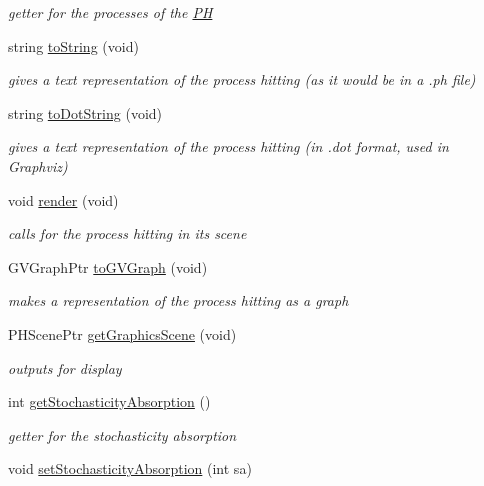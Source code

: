 \begin{DoxyCompactItemize}
\begin{DoxyCompactList}\small\item\em getter for the processes of the \hyperlink{class_p_h}{\-P\-H} \end{DoxyCompactList}\item 
string \hyperlink{class_p_h_ae870206aad796943dffaa6bab1f7f293}{to\-String} (void)
\begin{DoxyCompactList}\small\item\em gives a text representation of the process hitting (as it would be in a .ph file) \end{DoxyCompactList}\item 
string \hyperlink{class_p_h_aa0a7716cb565380f06670517609ee960}{to\-Dot\-String} (void)
\begin{DoxyCompactList}\small\item\em gives a text representation of the process hitting (in .dot format, used in \-Graphviz) \end{DoxyCompactList}\item 
void \hyperlink{class_p_h_af1f67304076aded44a15a30aed6dc652}{render} (void)
\begin{DoxyCompactList}\small\item\em calls for the process hitting in its scene \end{DoxyCompactList}\item 
\-G\-V\-Graph\-Ptr \hyperlink{class_p_h_a220fd9fdc673988edb461b02a90edb1b}{to\-G\-V\-Graph} (void)
\begin{DoxyCompactList}\small\item\em makes a representation of the process hitting as a graph \end{DoxyCompactList}\item 
\-P\-H\-Scene\-Ptr \hyperlink{class_p_h_aaf75a785bb9bd06cec611f0fb69d05f6}{get\-Graphics\-Scene} (void)
\begin{DoxyCompactList}\small\item\em outputs for display \end{DoxyCompactList}\item 
\hypertarget{class_p_h_a0494ca8a53e983230a9df06fa71043e1}{int \hyperlink{class_p_h_a0494ca8a53e983230a9df06fa71043e1}{get\-Stochasticity\-Absorption} ()}\label{class_p_h_a0494ca8a53e983230a9df06fa71043e1}

\begin{DoxyCompactList}\small\item\em getter for the stochasticity absorption \end{DoxyCompactList}\item 
\hypertarget{class_p_h_a78fb558177760ed0e640d8a0aaf8b06a}{void \hyperlink{class_p_h_a78fb558177760ed0e640d8a0aaf8b06a}{set\-Stochasticity\-Absorption} (int sa)}\label{class_p_h_a78fb558177760ed0e640d8a0aaf8b06a}


\end{DoxyCompactItemize}
